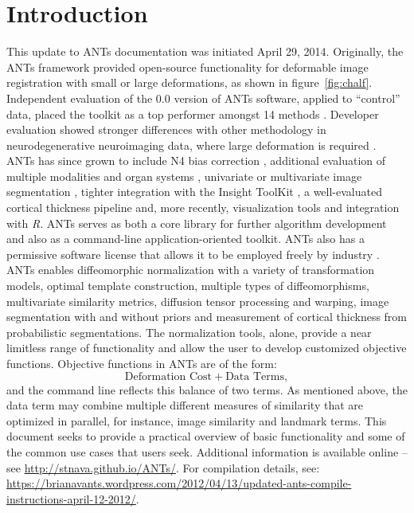 \documentclass{InsightArticle}
\newcommand{\R}{\textit{R}}
\begin{document}
\section{Introduction}
This update to ANTs documentation was initiated April 29, 2014.  
Originally, the ANTs framework provided open-source functionality for deformable
image registration with small or large deformations, as shown in
figure~\ref{fig:chalf}.  Independent evaluation of the 0.0 version of ANTs software, applied to ``control'' data, 
placed the toolkit as a top performer amongst 14
methods \cite{Klein2009}.  Developer evaluation showed stronger differences 
with other methodology in neurodegenerative neuroimaging data, 
where large deformation is required \cite{Avants2008b}. 
ANTs has since grown to include N4 bias
correction \cite{Tustison2010}, additional evaluation of multiple
modalities and organ systems \cite{Tustison2014,Tustison2011,Murphy2011}, univariate or multivariate image segmentation
\cite{Avants2011,Tustison2011a}, tighter integration with the Insight ToolKit \cite{Tustison2013,AvantsITK}, a
well-evaluated cortical thickness pipeline \cite{TustisonACT} and, more recently,
visualization tools and integration with \R \cite{ANTsAndArboles}.
ANTs serves as both a core library for further
algorithm development and also as a command-line application-oriented
toolkit.  ANTs also has a permissive software license that allows it
to be employed freely by industry \cite{rosen2004open}.
ANTs enables diffeomorphic normalization with a variety of
transformation models, optimal template construction, multiple types
of diffeomorphisms, multivariate similarity metrics, diffusion tensor
processing and warping, image segmentation with and without priors and
measurement of cortical thickness from probabilistic segmentations.
The normalization tools, alone, provide a near limitless range of
functionality and allow the user to develop customized objective
functions.  Objective functions in ANTs are of the form: $$
\text{Deformation Cost} + \text{Data Terms},$$ and the command
line reflects this balance of two terms.  As mentioned above, the
data term may combine multiple different measures of
similarity that are optimized in parallel, for instance, image similarity 
and landmark terms.  This document seeks to
provide a practical overview of basic functionality and some of the common use cases that
users seek.
Additional information is available online -- see 
\href{http://stnava.github.io/ANTs/}{http://stnava.github.io/ANTs/}.
For compilation details, see: \href{https://brianavants.wordpress.com/2012/04/13/updated-ants-compile-instructions-april-12-2012/}{https://brianavants.wordpress.com/2012/04/13/updated-ants-compile-instructions-april-12-2012/}.
\end{document}
